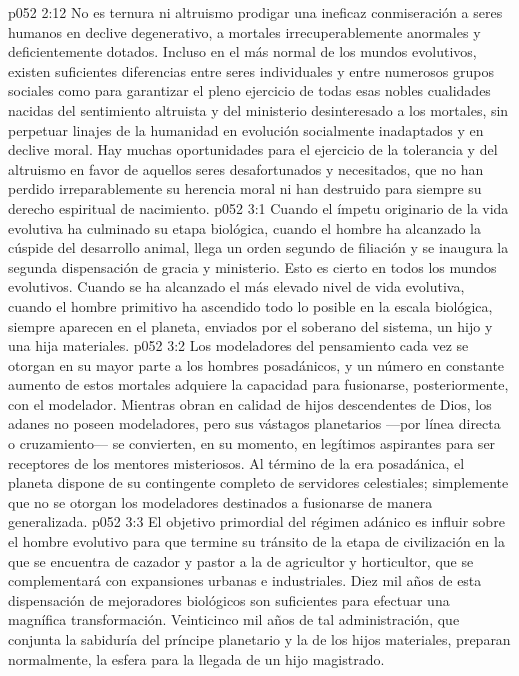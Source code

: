 \vs p052 2:12 No es ternura ni altruismo prodigar una ineficaz conmiseración a seres humanos en declive degenerativo, a mortales irrecuperablemente anormales y deficientemente dotados. Incluso en el más normal de los mundos evolutivos, existen suficientes diferencias entre seres individuales y entre numerosos grupos sociales como para garantizar el pleno ejercicio de todas esas nobles cualidades nacidas del sentimiento altruista y del ministerio desinteresado a los mortales, sin perpetuar linajes de la humanidad en evolución socialmente inadaptados y en declive moral. Hay muchas oportunidades para el ejercicio de la tolerancia y del altruismo en favor de aquellos seres desafortunados y necesitados, que no han perdido irreparablemente su herencia moral ni han destruido para siempre su derecho espiritual de nacimiento.
\vs p052 3:1 Cuando el ímpetu originario de la vida evolutiva ha culminado su etapa biológica, cuando el hombre ha alcanzado la cúspide del desarrollo animal, llega un orden segundo de filiación y se inaugura la segunda dispensación de gracia y ministerio. Esto es cierto en todos los mundos evolutivos. Cuando se ha alcanzado el más elevado nivel de vida evolutiva, cuando el hombre primitivo ha ascendido todo lo posible en la escala biológica, siempre aparecen en el planeta, enviados por el soberano del sistema, un hijo y una hija materiales.
\vs p052 3:2 Los modeladores del pensamiento cada vez se otorgan en su mayor parte a los hombres posadánicos, y un número en constante aumento de estos mortales adquiere la capacidad para fusionarse, posteriormente, con el modelador. Mientras obran en calidad de hijos descendentes de Dios, los adanes no poseen modeladores, pero sus vástagos planetarios ---por línea directa o cruzamiento--- se convierten, en su momento, en legítimos aspirantes para ser receptores de los mentores misteriosos. Al término de la era posadánica, el planeta dispone de su contingente completo de servidores celestiales; simplemente que no se otorgan los modeladores destinados a fusionarse de manera generalizada.
\vs p052 3:3 \pc El objetivo primordial del régimen adánico es influir sobre el hombre evolutivo para que termine su tránsito de la etapa de civilización en la que se encuentra de cazador y pastor a la de agricultor y horticultor, que se complementará con expansiones urbanas e industriales. Diez mil años de esta dispensación de mejoradores biológicos son suficientes para efectuar una magnífica transformación. Veinticinco mil años de tal administración, que conjunta la sabiduría del príncipe planetario y la de los hijos materiales, preparan normalmente, la esfera para la llegada de un hijo magistrado.
